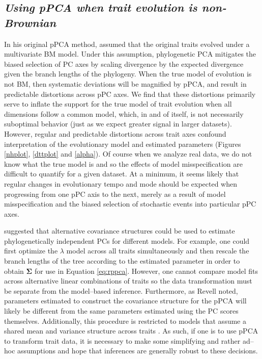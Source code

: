 \documentclass[a4paper,11pt]{article}
\begin{document}
\subsection{\emph{Using pPCA when trait evolution is non-Brownian}}
In his original pPCA method, \citet{Revell2008} assumed that the original traits evolved under a multivariate BM model. Under this assumption, phylogenetic PCA mitigates the biased selection of PC axes by scaling divergence by the expected divergence given the branch lengths of the phylogeny. When the true model of evolution is not BM, then systematic deviations will be magnified by pPCA, and result in predictable distortions across pPC axes. We find that these distortions primarily serve to inflate the support for the true model of trait evolution when all dimensions follow a common model, which, in and of itself, is not necessarily suboptimal behavior (just as we expect greater signal in larger datasets). However, regular and predictable distortions across trait axes confound interpretation of the evolutionary model and estimated parameters (Figures \ref{nhplot}, \ref{dttplot} and \ref{alpha}). Of course when we analyze real data, we do not know what the true model is and so the effects of model misspecification are difficult to quantify for a given dataset. At a minimum, it seems likely that regular changes in evolutionary tempo and mode should be expected when progressing from one pPC axis to the next, merely as a result of model misspecification and the biased selection of stochastic events into particular pPC axes.

\cite{Revell2008} suggested that alternative covariance structures could be used to estimate phylogenetically independent PCs for different models. For example, one could first optimize the $\lambda$ model \citep{Pagel1999} across all traits simultaneously and then rescale the branch lengths of the tree according to the estimated parameter in order to obtain $\mathbf{\Sigma}$ for use in Equation \ref{eq:rppca}. However, one cannot compare model fits across alternative linear combinations of traits so the data transformation must be separate from the model--based inference.  Furthermore, as Revell noted, parameters estimated to construct the covariance structure for the pPCA will likely be different from the same parameters estimated using the PC scores themselves. Additionally, this procedure is restricted to models that assume a shared mean and variance structure across traits \citep[see][for examples where this does not apply]{Hansen2008, Bartoszek2012}. As such, if one is to use pPCA to transform trait data, it is necessary to make some simplifying and rather ad--hoc assumptions and hope that inferences are generally robust to these decisions.
\end{document}
